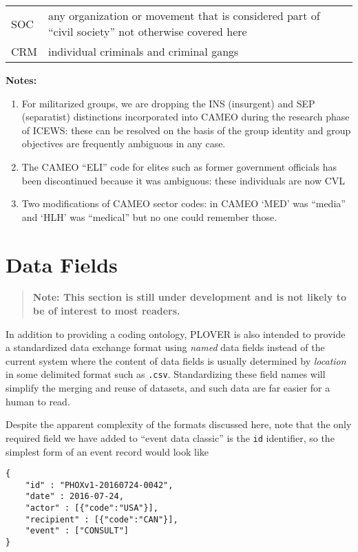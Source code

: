 \documentclass[11pt]{report}
\newcommand{\ti}[1]{\textit{#1}}
\newcommand{\txt}[1]{\texttt{#1}}
\begin{document}
\begin{center}
\begin{longtable}{|l|p{13cm}|}
	  SOC & any organization or movement that is considered part of ``civil society''  not otherwise covered here\\
	  CRM & individual criminals and criminal gangs \\
  \hline
\end{longtable}
\noindent \raggedright{\textbf{Notes:}}
\begin{enumerate}
\item For militarized groups, we are dropping the INS (insurgent) and SEP (separatist) distinctions incorporated into CAMEO during the research phase of ICEWS: these can be resolved on the basis of the group identity and group objectives are frequently ambiguous in any case. 
\item The CAMEO ``ELI'' code for elites such as former government officials has been discontinued because it was ambiguous: these individuals are now CVL
\item Two modifications of CAMEO sector codes: in CAMEO `MED' was ``media'' and `HLH' was ``medical'' but no one could remember those.
\end{enumerate}
\end{center}


\chapter{Data Fields}

\begin{quote}
\textbf{Note: This section is still under development and is not likely to be of interest to most readers.}

\end{quote}
\bigskip

In addition to providing a coding ontology, PLOVER is also intended to provide a standardized data exchange format using \ti{named} data fields instead of the current system where the content of data fields is usually determined by \ti{location} in some delimited format such as \txt{.csv}. Standardizing these field names will simplify the merging and reuse of datasets, and such data are far easier for a human to read. 

Despite the apparent complexity of the formats discussed here, note that the only required field we have added to ``event data classic'' is the \texttt{id} identifier, so the simplest form of an event record would look like
\begin{verbatim}
{
	"id" : "PHOXv1-20160724-0042",
	"date" : 2016-07-24,
	"actor" : [{"code":"USA"}],
	"recipient" : [{"code":"CAN"}],
	"event" : ["CONSULT"]
}
\end{verbatim}
\end{document}
